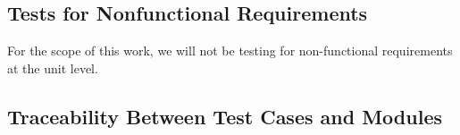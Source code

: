 \documentclass[12pt, titlepage]{article}
\begin{document}
\subsection{Tests for Nonfunctional Requirements}
For the scope of this work, we will not be testing for non-functional 
requirements at the unit level.
%
%
%		
%
%
%					
%					
%					
%					
%					
%
%					
%					
%					
%					
%
%
%

\subsection{Traceability Between Test Cases and Modules}






\newpage

%
%
%
\end{document}
